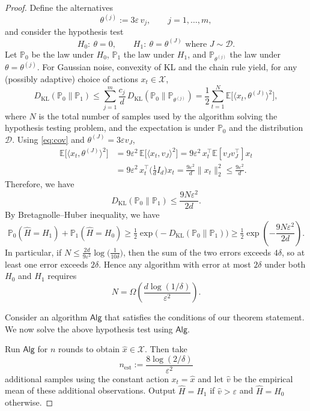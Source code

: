 \begin{proof}
Define the alternatives
\[
\theta^{(j)} := 3\varepsilon\, v_j,\qquad j=1,\dots,m,
\]
and consider the hypothesis test
\[
H_0:\ \theta = 0,
\qquad
H_1:\ \theta=\theta^{(J)} \text{ where } J \sim \mathcal{D}.
\]
Let $\mathbb{P}_0$ be the law under $H_0$, $\mathbb{P}_1$ the law under $H_1$, and $\mathbb{P}_{\theta^{(j)}}$ the law under $\theta=\theta^{(j)}$.
For Gaussian noise, convexity of KL and the chain rule yield, for any (possibly adaptive) choice of actions $x_t\in\mathcal{X}$,
\[
D_{\mathrm{KL}}(\mathbb{P}_0\|\mathbb{P}_1)
\le \sum_{j=1}^m \frac{c_j}{d}\,D_{\mathrm{KL}}(\mathbb{P}_0\|\mathbb{P}_{\theta^{(j)}})
= \frac12\sum_{t=1}^N \mathbb{E}\!\Big[\big\langle x_t,\theta^{(J)}\big\rangle^2\Big],
\]
where $N$ is the total number of samples used by the algorithm solving the hypothesis testing problem, and the expectation is under $\mathbb{P}_0$ and the distribution $\mathcal{D}$.
Using \eqref{eq:cov} and $\theta^{(J)}=3\varepsilon v_J$,
\begin{align*}
\mathbb{E}\!\Big[\big\langle x_t,\theta^{(J)}\big\rangle^2\Big]
&= 9\varepsilon^2\, \mathbb{E}\big[\langle x_t,v_J\rangle^2\big]
= 9\varepsilon^2\, x_t^\top \mathbb{E}[v_J v_J^\top] x_t \\
&= 9\varepsilon^2\, x_t^\top\Big(\frac{1}{d}I_d\Big)x_t
= \frac{9\varepsilon^2}{d}\|x_t\|_2^2
\le \frac{9\varepsilon^2}{d}.
\end{align*}
Therefore, we have
\begin{equation}\label{eq:KLmix}
D_{\mathrm{KL}}(\mathbb{P}_0\|\mathbb{P}_1)\le \frac{9N\varepsilon^2}{2d}.
\end{equation}
By Bretagnolle--Huber inequality, we have
\[
\mathbb{P}_0(\widehat{H}=H_1)+\mathbb{P}_1(\widehat{H}=H_0)
\ge \tfrac12\exp\!\big(-D_{\mathrm{KL}}(\mathbb{P}_0\|\mathbb{P}_1)\big)
\ge \tfrac12 \exp\!\left(-\frac{9N\varepsilon^2}{2d}\right).
\]
In particular, if $N \le \frac{2d}{9\varepsilon^2}\log\!\big(\frac{1}{10\delta}\big)$,
then the sum of the two errors exceeds $4\delta$, so at least one error exceeds $2\delta$.
Hence any algorithm with error at most $2\delta$ under both $H_0$ and $H_1$ requires
\begin{equation}\label{eq:testlb}
N=\Omega\!\left(\frac{d\log(1/\delta)}{\varepsilon^2}\right).
\end{equation}

Consider an algorithm $\mathsf{Alg}$ that satisfies the conditions of our theorem statement. We now solve the above hypothesis test using $\mathsf{Alg}$.

Run $\mathsf{Alg}$ for $n$ rounds to obtain $\widehat{x}\in\mathcal{X}$.
Then take
\[
n_{\mathrm{est}} :=  \frac{8\log(2/\delta)}{\varepsilon^2}
\]
additional samples using the constant action $x_t=\widehat{x}$ and let $\widehat{v}$ be the empirical mean of these additional observations. Output $\widehat{H}=H_1$ if $\widehat{v}>\varepsilon$ and $\widehat{H}=H_0$ otherwise.


\end{proof}
